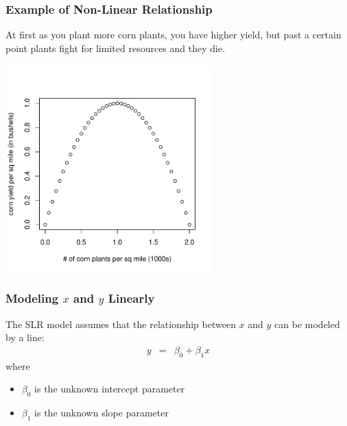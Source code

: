 \documentclass[handout]{beamer}
\newcommand{\blue}[1]{\textcolor{blue2}{#1}}
\begin{document}
\begin{frame}[fragile]
\frametitle{Example of Non-Linear Relationship}
At first as you plant more corn plants, you have higher yield, but past a certain point plants fight for limited resources and they die. 
\begin{center}
\pause \includegraphics[width=0.6\textwidth]{figure/nonlinear.pdf}
\end{center}
   
\end{frame}


\begin{frame}
\frametitle{Modeling $x$ and $y$ Linearly}
%
%
The \blue{SLR model} assumes that the relationship between $x$ and $y$ can be modeled by a line:
\begin{eqnarray*}
y &=& \beta_0 + \beta_1 x
\end{eqnarray*}
where 
\pause\begin{itemize}
\item $\beta_0$ is the unknown \blue{intercept parameter}
\item $\beta_1$ is the unknown \blue{slope parameter}
\end{itemize}

\end{frame}
\end{document}
